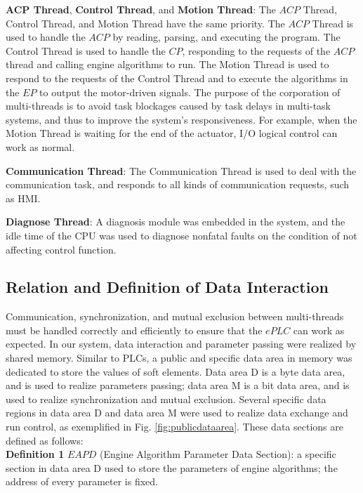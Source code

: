 \documentclass[journal]{IEEEtran}
\begin{document}
\textbf{ACP Thread}, \textbf{Control Thread}, and \textbf{Motion Thread}: The $ACP$ Thread, Control Thread, and Motion Thread have the same priority. The $ACP$ Thread is used to handle the $ACP$ by reading, parsing, and executing the program. The Control Thread is used to handle the $CP$, responding to the requests of the $ACP$ thread and calling engine algorithms to run. The Motion Thread is used to respond to the requests of the Control Thread and to execute the algorithms in the $EP$ to output the motor-driven signals. The purpose of the corporation of multi-threads is to avoid task blockages caused by task delays in multi-task systems, and thus to improve the system's responsiveness. For example, when the Motion Thread is waiting for the end of the actuator, I/O logical control can work as normal.


\textbf{Communication Thread}: The Communication Thread is used to deal with the communication task, and responds to all kinds of communication requests, such as HMI.

\textbf{Diagnose Thread}: A diagnosis module was embedded in the system, and the idle time of the CPU was used to diagnose nonfatal faults on the condition of not affecting control function.


\subsection{Relation and Definition of Data Interaction}
Communication, synchronization, and mutual exclusion between multi-threads must be handled correctly and efficiently to ensure that the $ePLC$ can work as expected. In our system, data interaction and parameter passing were realized by shared memory. Similar to PLCs, a public and specific data area in memory was dedicated to store the values of soft elements. Data area D is a byte data area, and is used to realize parameters passing; data area M is a bit data area, and is used to realize synchronization and mutual exclusion. Several specific data regions in data area D and data area M were used to realize data exchange and run control, as exemplified in Fig. \ref{fig:publicdataarea}. These data sections are defined as follows:\\

\textbf{Definition 1} $EAPD$ (Engine Algorithm Parameter Data Section): a specific section in data area D used to store the parameters of engine algorithms; the address of every parameter is fixed.\\
\end{document}
